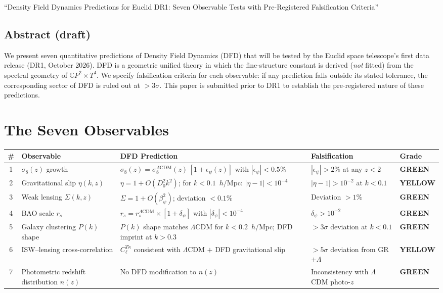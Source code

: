 \documentclass[11pt,a4paper]{article}
\newcommand{\GREEN}{\textcolor{dfdgreen}{\textbf{GREEN}}}
\newcommand{\YELLOW}{\textcolor{dfdyellow}{\textbf{YELLOW}}}
\newcommand{\CP}{\mathbb{C}P}
\begin{document}
``Density Field Dynamics Predictions for Euclid DR1: Seven Observable Tests with Pre-Registered Falsification Criteria''

\subsection{Abstract (draft)}

We present seven quantitative predictions of Density Field Dynamics (DFD) that will be tested by the Euclid space telescope's first data release (DR1, October 2026). DFD is a geometric unified theory in which the fine-structure constant is derived (\emph{not} fitted) from the spectral geometry of $\CP^2 \times T^4$. We specify falsification criteria for each observable: if any prediction falls outside its stated tolerance, the corresponding sector of DFD is ruled out at $> 3\sigma$. This paper is submitted prior to DR1 to establish the pre-registered nature of these predictions.

\section{The Seven Observables}

\begin{center}
\begin{longtable}{clp{5cm}ll}
\toprule
\textbf{\#} & \textbf{Observable} & \textbf{DFD Prediction} & \textbf{Falsification} & \textbf{Grade} \\
\midrule
\endhead
1 & $\sigma_8(z)$ growth & $\sigma_8(z) = \sigma_8^{\Lambda\text{CDM}}(z)\,[1 + \epsilon_\psi(z)]$ with $|\epsilon_\psi| < 0.5\%$ & $|\epsilon_\psi| > 2\%$ at any $z < 2$ & \GREEN \\
\midrule
2 & Gravitational slip $\eta(k,z)$ & $\eta = 1 + O(D_0^2 k^2)$; for $k < 0.1$~$h$/Mpc: $|\eta - 1| < 10^{-4}$ & $|\eta - 1| > 10^{-2}$ at $k < 0.1$ & \YELLOW \\
\midrule
3 & Weak lensing $\Sigma(k,z)$ & $\Sigma = 1 + O(\beta_\psi^2)$; deviation $< 0.1\%$ & Deviation $> 1\%$ & \GREEN \\
\midrule
4 & BAO scale $r_s$ & $r_s = r_s^{\Lambda\text{CDM}} \times [1 + \delta_\psi]$ with $|\delta_\psi| < 10^{-4}$ & $\delta_\psi > 10^{-2}$ & \GREEN \\
\midrule
5 & Galaxy clustering $P(k)$ shape & $P(k)$ shape matches $\Lambda$CDM for $k < 0.2$~$h$/Mpc; DFD imprint at $k > 0.3$ & $> 3\sigma$ deviation at $k < 0.1$ & \GREEN \\
\midrule
6 & ISW--lensing cross-correlation & $C_\ell^{T\kappa}$ consistent with $\Lambda$CDM $+$ DFD gravitational slip & $> 5\sigma$ deviation from GR$+\Lambda$ & \YELLOW \\
\midrule
7 & Photometric redshift distribution $n(z)$ & No DFD modification to $n(z)$ & Inconsistency with $\Lambda$CDM photo-$z$ & \GREEN \\
\bottomrule
\end{longtable}
\end{center}
\end{document}
